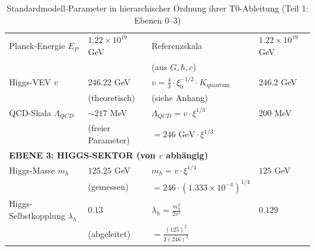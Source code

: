 \begin{table}[htbp]
{\begin{tabular}{p{4cm}p{2.5cm}p{3.5cm}p{2.7cm}}
			Planck-Energie $E_P$ & $1.22 \times 10^{19}$ GeV & Referenzskala & $1.22 \times 10^{19}$ GeV \\
			& & (aus $G, \hbar, c$) & \\[0.3em]
			Higgs-VEV $v$ & $246.22$ GeV & $v = \frac{4}{3} \cdot \xi_0^{-1/2} \cdot K_{\text{quantum}}$ & $246.2$ GeV \\
			& (theoretisch) & (siehe Anhang) & \\[0.3em]
			QCD-Skala $\Lambda_{QCD}$ & $\sim 217$ MeV & $\Lambda_{QCD} = v \cdot \xi^{1/3}$ & $200$ MeV \\
			& (freier Parameter) & $= 246 \text{ GeV} \cdot \xi^{1/3}$ & \\[0.3em]
			\midrule
			\multicolumn{4}{l}{\textbf{EBENE 3: HIGGS-SEKTOR (von $v$ abhängig)}} \\
			\midrule
			Higgs-Masse $m_h$ & $125.25$ GeV & $m_h = v \cdot \xi^{1/4}$ & $125$ GeV \\
			& (gemessen) & $= 246 \cdot (1.333 \times 10^{-4})^{1/4}$ & \\[0.3em]
			Higgs-Selbstkopplung $\lambda_h$ & $0.13$ & $\lambda_h = \frac{m_h^2}{2v^2}$ & $0.129$ \\
			& (abgeleitet) & $= \frac{(125)^2}{2(246)^2}$ & \\[0.3em]
			\bottomrule
		\end{tabular}%
}
	\caption{Standardmodell-Parameter in hierarchischer Ordnung ihrer T0-Ableitung (Teil 1: Ebenen 0--3)}
	\label{tab:sm-params-1}
\end{table}
